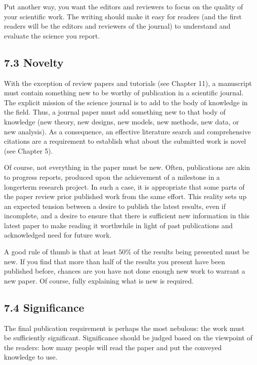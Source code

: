 Put another way, you want the editors and reviewers to focus on the quality of your scientific work. The writing should make it easy for readers (and the first readers will be the editors and reviewers of the journal) to understand and evaluate the science you report.

\subsection*{7.3 Novelty}
With the exception of review papers and tutorials (see Chapter 11), a manuscript must contain something new to be worthy of publication in a scientific journal. The explicit mission of the science journal is to add to the body of knowledge in the field. Thus, a journal paper must add something new to that body of knowledge (new theory, new designs, new models, new methods, new data, or new analysis). As a consequence, an effective literature search and comprehensive citations are a requirement to establish what about the submitted work is novel (see Chapter 5).

Of course, not everything in the paper must be new. Often, publications are akin to progress reports, produced upon the achievement of a milestone in a longerterm research project. In such a case, it is appropriate that some parts of the paper review prior published work from the same effort. This reality sets up an expected tension between a desire to publish the latest results, even if incomplete, and a desire to ensure that there is sufficient new information in this latest paper to make reading it worthwhile in light of past publications and acknowledged need for future work.

A good rule of thumb is that at least $50 \%$ of the results being presented must be new. If you find that more than half of the results you present have been published before, chances are you have not done enough new work to warrant a new paper. Of course, fully explaining what is new is required.

\subsection*{7.4 Significance}
The final publication requirement is perhaps the most nebulous: the work must be sufficiently significant. Significance should be judged based on the viewpoint of the readers: how many people will read the paper and put the conveyed knowledge to use.

